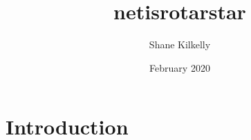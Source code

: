 \documentclass{article}
\title{netisrotarstar}
\author{Shane Kilkelly}
\date{February 2020}
\begin{document}
\maketitle

\section{Introduction}
\end{document}
